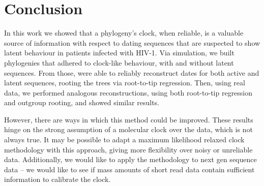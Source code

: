 \section * {Conclusion} \label{sec:conclusion}
In this work we showed that a phylogeny's clock, when reliable, is a valuable source of information with respect to dating sequences that are suspected to show latent behaviour in patients infected with HIV-1. 
Via simulation, we built phylogenies that adhered to clock-like behaviour, with and without latent sequences.
From those, were able to reliably reconstruct dates for both active and latent sequences, rooting the trees via root-to-tip regression.
Then, using real data, we performed analogous reconstructions, using both root-to-tip regression and outgroup rooting, and showed similar results.

However, there are ways in which this method could be improved. 
These results hinge on the strong assumption of a molecular clock over the data, which is not always true. 
It may be possible to adapt a maximum likelihood relaxed clock methodology with this approach, giving more flexibility over noisy or unreliable data. 
Additionally, we would like to apply the methodology to next gen sequence data -- we would like to see if mass amounts of short read data contain sufficient information to calibrate the clock.
